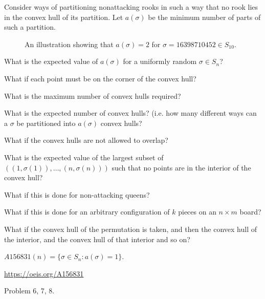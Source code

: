 \documentclass{article}
\begin{document}
Consider ways of partitioning nonattacking rooks in such a way that no rook lies
in the convex hull of its partition. Let $a(\sigma)$ be the minimum number of parts
of such a partition.
\begin{figure}[ht!]
  \centering
  \caption{
    An illustration showing that $a(\sigma) = 2$ for $\sigma = 16398710452 \in S_{10}$.
  }
\end{figure}

\begin{question}
  What is the expected value of $a(\sigma)$ for a uniformly random $\sigma \in S_n$?
\end{question}

\begin{related}
  \item What if each point must be on the corner of the convex hull?
  \item What is the maximum number of convex hulls required?
  \item What is the expected number of convex hulls?
  (i.e. how many different ways can a $\sigma$ be partitioned into
  $a(\sigma)$ convex hulls?
  \item What if the convex hulls are not allowed to overlap?
  \item What is the expected value of the largest subset of
    $((1, \sigma(1)), \hdots, (n, \sigma(n)))$ such that no points are in the
    interior of the convex hull?
  \item What if this is done for non-attacking queens?
  \item What if this is done for an arbitrary configuration of $k$ pieces on an
    $n \times m$ board?
  \item What if the convex hull of the permutation is taken, and then the convex hull of the interior, and the convex hull of that interior and so on?
\end{related}

\begin{note}
  \item $A156831(n) = \{ \sigma \in S_n : a(\sigma) = 1 \}$.
\end{note}

\begin{references}
  \item \url{https://oeis.org/A156831}
  \item Problem 6, 7, 8.
\end{references}
\end{document}
